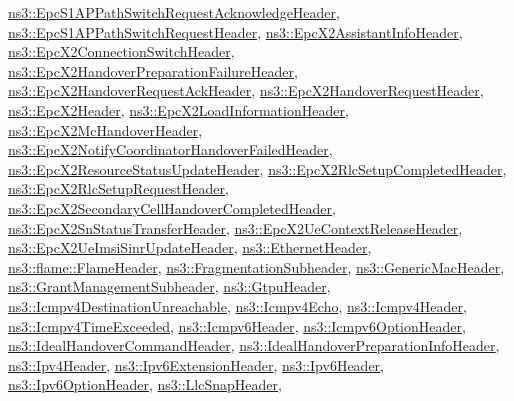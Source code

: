 \hyperlink{classns3_1_1EpcS1APPathSwitchRequestAcknowledgeHeader}{ns3\+::\+Epc\+S1\+A\+P\+Path\+Switch\+Request\+Acknowledge\+Header}, \hyperlink{classns3_1_1EpcS1APPathSwitchRequestHeader}{ns3\+::\+Epc\+S1\+A\+P\+Path\+Switch\+Request\+Header}, \hyperlink{classns3_1_1EpcX2AssistantInfoHeader}{ns3\+::\+Epc\+X2\+Assistant\+Info\+Header}, \hyperlink{classns3_1_1EpcX2ConnectionSwitchHeader}{ns3\+::\+Epc\+X2\+Connection\+Switch\+Header}, \hyperlink{classns3_1_1EpcX2HandoverPreparationFailureHeader}{ns3\+::\+Epc\+X2\+Handover\+Preparation\+Failure\+Header}, \hyperlink{classns3_1_1EpcX2HandoverRequestAckHeader}{ns3\+::\+Epc\+X2\+Handover\+Request\+Ack\+Header}, \hyperlink{classns3_1_1EpcX2HandoverRequestHeader}{ns3\+::\+Epc\+X2\+Handover\+Request\+Header}, \hyperlink{classns3_1_1EpcX2Header}{ns3\+::\+Epc\+X2\+Header}, \hyperlink{classns3_1_1EpcX2LoadInformationHeader}{ns3\+::\+Epc\+X2\+Load\+Information\+Header}, \hyperlink{classns3_1_1EpcX2McHandoverHeader}{ns3\+::\+Epc\+X2\+Mc\+Handover\+Header}, \hyperlink{classns3_1_1EpcX2NotifyCoordinatorHandoverFailedHeader}{ns3\+::\+Epc\+X2\+Notify\+Coordinator\+Handover\+Failed\+Header}, \hyperlink{classns3_1_1EpcX2ResourceStatusUpdateHeader}{ns3\+::\+Epc\+X2\+Resource\+Status\+Update\+Header}, \hyperlink{classns3_1_1EpcX2RlcSetupCompletedHeader}{ns3\+::\+Epc\+X2\+Rlc\+Setup\+Completed\+Header}, \hyperlink{classns3_1_1EpcX2RlcSetupRequestHeader}{ns3\+::\+Epc\+X2\+Rlc\+Setup\+Request\+Header}, \hyperlink{classns3_1_1EpcX2SecondaryCellHandoverCompletedHeader}{ns3\+::\+Epc\+X2\+Secondary\+Cell\+Handover\+Completed\+Header}, \hyperlink{classns3_1_1EpcX2SnStatusTransferHeader}{ns3\+::\+Epc\+X2\+Sn\+Status\+Transfer\+Header}, \hyperlink{classns3_1_1EpcX2UeContextReleaseHeader}{ns3\+::\+Epc\+X2\+Ue\+Context\+Release\+Header}, \hyperlink{classns3_1_1EpcX2UeImsiSinrUpdateHeader}{ns3\+::\+Epc\+X2\+Ue\+Imsi\+Sinr\+Update\+Header}, \hyperlink{classns3_1_1EthernetHeader}{ns3\+::\+Ethernet\+Header}, \hyperlink{classns3_1_1flame_1_1FlameHeader}{ns3\+::flame\+::\+Flame\+Header}, \hyperlink{classns3_1_1FragmentationSubheader}{ns3\+::\+Fragmentation\+Subheader}, \hyperlink{classns3_1_1GenericMacHeader}{ns3\+::\+Generic\+Mac\+Header}, \hyperlink{classns3_1_1GrantManagementSubheader}{ns3\+::\+Grant\+Management\+Subheader}, \hyperlink{classns3_1_1GtpuHeader}{ns3\+::\+Gtpu\+Header}, \hyperlink{classns3_1_1Icmpv4DestinationUnreachable}{ns3\+::\+Icmpv4\+Destination\+Unreachable}, \hyperlink{classns3_1_1Icmpv4Echo}{ns3\+::\+Icmpv4\+Echo}, \hyperlink{classns3_1_1Icmpv4Header}{ns3\+::\+Icmpv4\+Header}, \hyperlink{classns3_1_1Icmpv4TimeExceeded}{ns3\+::\+Icmpv4\+Time\+Exceeded}, \hyperlink{classns3_1_1Icmpv6Header}{ns3\+::\+Icmpv6\+Header}, \hyperlink{classns3_1_1Icmpv6OptionHeader}{ns3\+::\+Icmpv6\+Option\+Header}, \hyperlink{classns3_1_1IdealHandoverCommandHeader}{ns3\+::\+Ideal\+Handover\+Command\+Header}, \hyperlink{classns3_1_1IdealHandoverPreparationInfoHeader}{ns3\+::\+Ideal\+Handover\+Preparation\+Info\+Header}, \hyperlink{classns3_1_1Ipv4Header}{ns3\+::\+Ipv4\+Header}, \hyperlink{classns3_1_1Ipv6ExtensionHeader}{ns3\+::\+Ipv6\+Extension\+Header}, \hyperlink{classns3_1_1Ipv6Header}{ns3\+::\+Ipv6\+Header}, \hyperlink{classns3_1_1Ipv6OptionHeader}{ns3\+::\+Ipv6\+Option\+Header}, \hyperlink{classns3_1_1LlcSnapHeader}{ns3\+::\+Llc\+Snap\+Header}, 